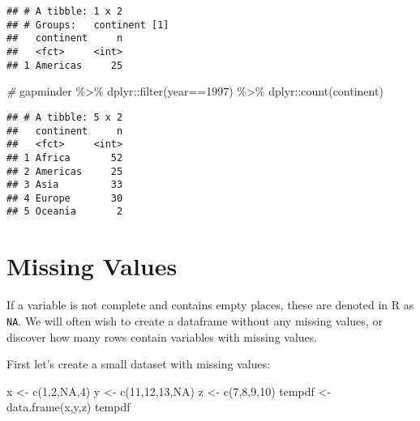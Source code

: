 \documentclass[
]{book}
\newenvironment{Shaded}{\begin{snugshade}}{\end{snugshade}}
\newcommand{\CommentTok}[1]{\textcolor[rgb]{0.56,0.35,0.01}{\textit{#1}}}
\newcommand{\ConstantTok}[1]{\textcolor[rgb]{0.00,0.00,0.00}{#1}}
\newcommand{\DecValTok}[1]{\textcolor[rgb]{0.00,0.00,0.81}{#1}}
\newcommand{\FunctionTok}[1]{\textcolor[rgb]{0.00,0.00,0.00}{#1}}
\newcommand{\NormalTok}[1]{#1}
\newcommand{\OtherTok}[1]{\textcolor[rgb]{0.56,0.35,0.01}{#1}}
\newcommand{\SpecialCharTok}[1]{\textcolor[rgb]{0.00,0.00,0.00}{#1}}
\begin{document}
\begin{verbatim}
## # A tibble: 1 x 2
## # Groups:   continent [1]
##   continent     n
##   <fct>     <int>
## 1 Americas     25
\end{verbatim}

\begin{Shaded}
\begin{Highlighting}[]
\CommentTok{\#}
\NormalTok{gapminder }\SpecialCharTok{\%\textgreater{}\%} 
\NormalTok{  dplyr}\SpecialCharTok{::}\FunctionTok{filter}\NormalTok{(year}\SpecialCharTok{==}\DecValTok{1997}\NormalTok{) }\SpecialCharTok{\%\textgreater{}\%}
\NormalTok{  dplyr}\SpecialCharTok{::}\FunctionTok{count}\NormalTok{(continent)}
\end{Highlighting}
\end{Shaded}

\begin{verbatim}
## # A tibble: 5 x 2
##   continent     n
##   <fct>     <int>
## 1 Africa       52
## 2 Americas     25
## 3 Asia         33
## 4 Europe       30
## 5 Oceania       2
\end{verbatim}

\hypertarget{missing-values}{%
\section{Missing Values}\label{missing-values}}

If a variable is not complete and contains empty places, these are denoted in R as \texttt{NA}. We will often wish to create a dataframe without any missing values, or discover how many rows contain variables with missing values.

First let's create a small dataset with missing values:

\begin{Shaded}
\begin{Highlighting}[]
\NormalTok{x }\OtherTok{\textless{}{-}} \FunctionTok{c}\NormalTok{(}\DecValTok{1}\NormalTok{,}\DecValTok{2}\NormalTok{,}\ConstantTok{NA}\NormalTok{,}\DecValTok{4}\NormalTok{)}
\NormalTok{y }\OtherTok{\textless{}{-}} \FunctionTok{c}\NormalTok{(}\DecValTok{11}\NormalTok{,}\DecValTok{12}\NormalTok{,}\DecValTok{13}\NormalTok{,}\ConstantTok{NA}\NormalTok{)}
\NormalTok{z }\OtherTok{\textless{}{-}} \FunctionTok{c}\NormalTok{(}\DecValTok{7}\NormalTok{,}\DecValTok{8}\NormalTok{,}\DecValTok{9}\NormalTok{,}\DecValTok{10}\NormalTok{)}
\NormalTok{tempdf }\OtherTok{\textless{}{-}} \FunctionTok{data.frame}\NormalTok{(x,y,z)}
\NormalTok{tempdf}
\end{Highlighting}
\end{Shaded}
\end{document}
